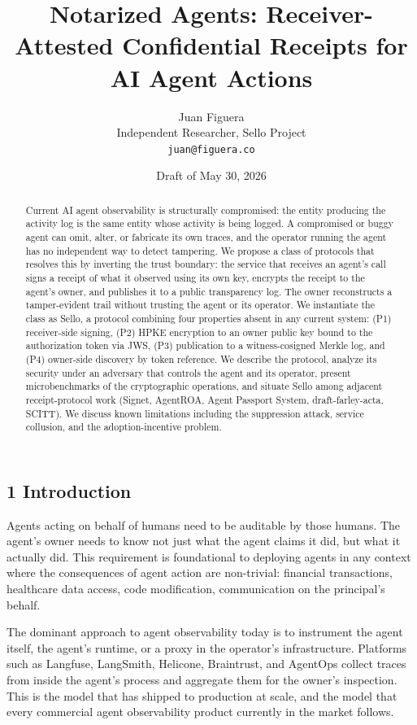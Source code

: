 \documentclass[
  11pt,
]{article}
\title{Notarized Agents: Receiver-Attested Confidential Receipts for AI
Agent Actions}
\author{Juan Figuera\\
Independent Researcher, Sello Project\\
\texttt{juan@figuera.co}}
\date{Draft of May 30, 2026}
\begin{document}
\maketitle
\begin{abstract}
Current AI agent observability is structurally compromised: the entity
producing the activity log is the same entity whose activity is being
logged. A compromised or buggy agent can omit, alter, or fabricate its
own traces, and the operator running the agent has no independent way to
detect tampering. We propose a class of protocols that resolves this by
inverting the trust boundary: the service that receives an agent's call
signs a receipt of what it observed using its own key, encrypts the
receipt to the agent's owner, and publishes it to a public transparency
log. The owner reconstructs a tamper-evident trail without trusting the
agent or its operator. We instantiate the class as Sello, a protocol
combining four properties absent in any current system: (P1)
receiver-side signing, (P2) HPKE encryption to an owner public key bound
to the authorization token via JWS, (P3) publication to a
witness-cosigned Merkle log, and (P4) owner-side discovery by token
reference. We describe the protocol, analyze its security under an
adversary that controls the agent and its operator, present
microbenchmarks of the cryptographic operations, and situate Sello among
adjacent receipt-protocol work (Signet, AgentROA, Agent Passport System,
draft-farley-acta, SCITT). We discuss known limitations including the
suppression attack, service collusion, and the adoption-incentive
problem.
\end{abstract}

\hypertarget{introduction}{%
\subsection{1 Introduction}\label{introduction}}

Agents acting on behalf of humans need to be auditable by those humans.
The agent's owner needs to know not just what the agent claims it did,
but what it actually did. This requirement is foundational to deploying
agents in any context where the consequences of agent action are
non-trivial: financial transactions, healthcare data access, code
modification, communication on the principal's behalf.

The dominant approach to agent observability today is to instrument the
agent itself, the agent's runtime, or a proxy in the operator's
infrastructure. Platforms such as Langfuse, LangSmith, Helicone,
Braintrust, and AgentOps collect traces from inside the agent's process
and aggregate them for the owner's inspection. This is the model that
has shipped to production at scale, and the model that every commercial
agent observability product currently in the market follows.
\end{document}
